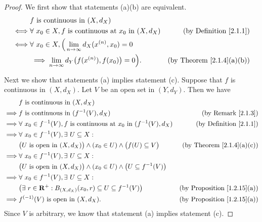 \begin{proof}
    We first show that statements (a)(b) are equivalent.
    \begin{align*}
             & f \text{ is continuous in } (X, d_X)                                                                             \\
        \iff & \forall\ x_0 \in X, f \text{ is continuous at } x_0 \text{ in } (X, d_X) & \text{(by Definition \ref{2.1.1})}    \\
        \iff & \forall\ x_0 \in X, \Big(\lim_{n \to \infty} d_X(x^{(n)}, x_0) = 0                                               \\
             & \implies \lim_{n \to \infty} d_Y\big(f(x^{(n)}), f(x_0)\big) = 0\Big).   & \text{(by Theorem \ref{2.1.4}(a)(b))}
    \end{align*}

    Next we show that statements (a) implies statement (c).
    Suppose that \(f\) is continuous in \((X, d_X)\).
    Let \(V\) be an open set in \((Y, d_Y)\).
    Then we have
    \begin{align*}
                 & f \text{ is continuous in } (X, d_X)                                                                                                       \\
        \implies & f \text{ is continuous in } (f^{-1}(V), d_X)                                                     & \text{(by Remark \ref{2.1.3})}          \\
        \implies & \forall\ x_0 \in f^{-1}(V), f \text{ is continuous at } x_0 \text{ in } (f^{-1}(V), d_X)         & \text{(by Definition \ref{2.1.1})}      \\
        \implies & \forall\ x_0 \in f^{-1}(V), \exists\ U \subseteq X :                                                                                       \\
                 & \big(U \text{ is open in } (X, d_X)\big) \land (x_0 \in U) \land \big(f(U) \subseteq V\big)      & \text{(by Theorem \ref{2.1.4}(a)(c))}   \\
        \implies & \forall\ x_0 \in f^{-1}(V), \exists\ U \subseteq X :                                                                                       \\
                 & \big(U \text{ is open in } (X, d_X)\big) \land (x_0 \in U) \land \big(U \subseteq f^{-1}(V)\big)                                           \\
        \implies & \forall\ x_0 \in f^{-1}(V), \exists\ U \subseteq X :                                                                                       \\
                 & \big(\exists\ r \in \mathbf{R}^+ : B_{(X, d_X)}(x_0, r) \subseteq U \subseteq f^{-1}(V)\big)     & \text{(by Proposition \ref{1.2.15}(a))} \\
        \implies & f^{(-1)}(V) \text{ is open in } (X, d_X).                                                        & \text{(by Proposition \ref{1.2.15}(a))}
    \end{align*}
    Since \(V\) is arbitrary, we know that statement (a) implies statement (c).


\end{proof}
